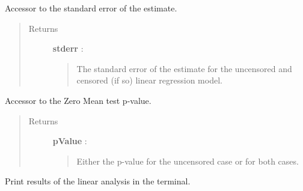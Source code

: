 \documentclass[letterpaper,10pt,english]{sphinxmanual}
\begin{document}
\begin{fulllineitems}
\begin{fulllineitems}
\label{_generated/otpod.UnivariateLinearModelAnalysis:otpod.UnivariateLinearModelAnalysis.getStandardError}
Accessor to the standard error of the estimate.
\begin{quote}\begin{description}
\item[{Returns}] \leavevmode
\textbf{stderr} : \href{http://doc.openturns.org/openturns-latest/sphinx/user\_manual/\_generated/openturns.NumericalPoint.html\#openturns.NumericalPoint}{}
\begin{quote}

The standard error of the estimate for the uncensored and censored
(if so) linear regression model.
\end{quote}

\end{description}\end{quote}

\end{fulllineitems}


\begin{fulllineitems}
\label{_generated/otpod.UnivariateLinearModelAnalysis:otpod.UnivariateLinearModelAnalysis.getZeroMeanPValue}
Accessor to the Zero Mean test p-value.
\begin{quote}\begin{description}
\item[{Returns}] \leavevmode
\textbf{pValue} : \href{http://doc.openturns.org/openturns-latest/sphinx/user\_manual/\_generated/openturns.NumericalPoint.html\#openturns.NumericalPoint}{}
\begin{quote}

Either the p-value for the uncensored case or for both cases.
\end{quote}

\end{description}\end{quote}

\end{fulllineitems}


\begin{fulllineitems}
\label{_generated/otpod.UnivariateLinearModelAnalysis:otpod.UnivariateLinearModelAnalysis.printResults}
Print results of the linear analysis in the terminal.


\end{fulllineitems}
\end{fulllineitems}
\end{document}
